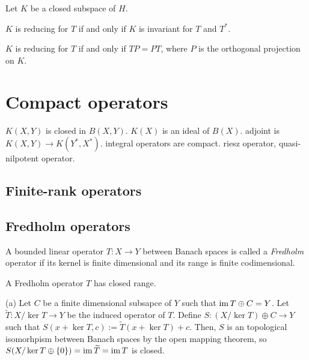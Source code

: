 \documentclass{../../large}
\begin{document}
\begin{prb}
Let $K$ be a closed subspace of $H$.
\begin{parts}
\item $K$ is reducing for $T$ if and only if $K$ is invariant for $T$ and $T^*$.
\item $K$ is reducing for $T$ if and only if $TP=PT$, where $P$ is the orthogonal projection on $K$.
\end{parts}
\end{prb}









\chapter{Compact operators}

$K(X,Y)$ is closed in $B(X,Y)$.
$K(X)$ is an ideal of $B(X)$.
adjoint is $K(X,Y)\to K(Y^*,X^*)$.
integral operators are compact.
riesz operator, quasi-nilpotent operator.

\section{Finite-rank operators}
\section{Fredholm operators}

\begin{prb}
A bounded linear operator $T:X\to Y$ between Banach spaces is called a \emph{Fredholm} operator if its kernel is finite dimensional and its range is finite codimensional.
\begin{parts}
\item A Fredholm operator $T$ has closed range.
\end{parts}
\end{prb}
\begin{pf}
(a)
Let $C$ be a finite dimensional subsapce of $Y$ such that $\operatorname{im} T\oplus C=Y$.
Let $\tilde T:X/\ker T\to Y$ be the induced operator of $T$.
Define $S:(X/\ker T)\oplus C\to Y$ such that $S(x+\ker T,c):=\tilde T(x+\ker T)+c$.
Then, $S$ is an topological isomorhpism between Banach spaces by the open mapping theorem, so $S(X/\ker T\oplus\{0\})=\operatorname{im}\widetilde T=\operatorname{im} T$ is closed.
\end{pf}
\end{document}
